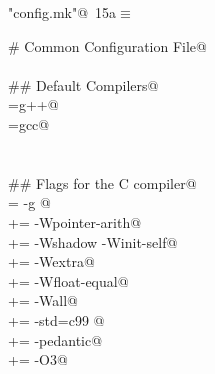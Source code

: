 \documentclass[a4paper,11pt]{article}
\begin{document}
\begin{flushleft} \small
\begin{minipage}{\linewidth}\label{scrap21}\raggedright\small
{} \verb@"config.mk"@\nobreak\ {\footnotesize {15a}}$\equiv$
\vspace{-1ex}
\begin{list}{}{} \item
\mbox{}\verb@# Common Configuration File@\\
\mbox{}\verb@@\\
\mbox{}\verb@## Default Compilers@\\
\mbox{}\verb@CXX=g++@\\
\mbox{}\verb@CC=gcc@\\
\mbox{}\verb@@\\
\mbox{}\verb@@\\
\mbox{}\verb@## Flags for the C compiler@\\
\mbox{}\verb@CCFLAGS  = -g @\\
\mbox{}\verb@CCFLAGS += -Wpointer-arith@\\
\mbox{}\verb@CCFLAGS += -Wshadow -Winit-self@\\
\mbox{}\verb@CCFLAGS += -Wextra@\\
\mbox{}\verb@CCFLAGS += -Wfloat-equal@\\
\mbox{}\verb@CCFLAGS += -Wall@\\
\mbox{}\verb@CCFLAGS += -std=c99 @\\
\mbox{}\verb@CCFLAGS += -pedantic@\\
\mbox{}\verb@CCFLAGS += -O3@\\
\mbox{}\verb@@{\NWsep}
\end{list}
\vspace{-1.5ex}
\footnotesize
\begin{list}{}{\setlength{\itemsep}{-\parsep}\setlength{\itemindent}{-\leftmargin}}

\item{}
\end{list}
\end{minipage}\vspace{4ex}
\end{flushleft}
\end{document}
